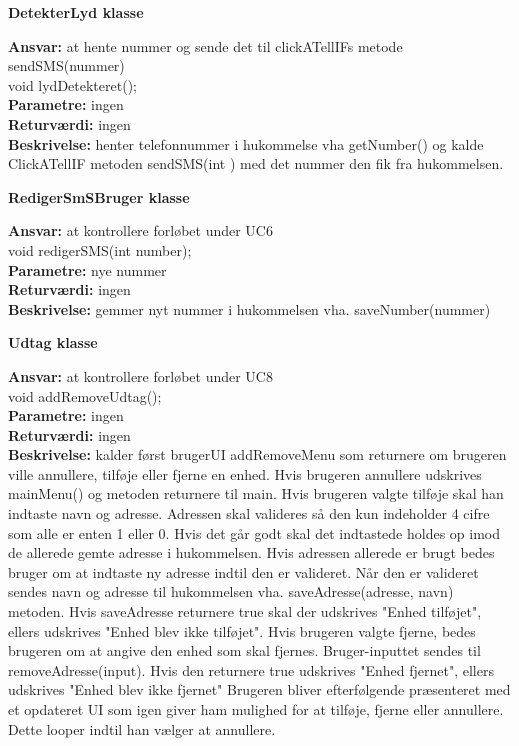 {\centering 
\textbf{DetekterLyd klasse}\par
}
\textbf{Ansvar:} at hente nummer og sende det til clickATellIFs metode sendSMS(nummer) \\

void lydDetekteret(); \\
\textbf{Parametre:} ingen \\
\textbf{Returværdi:} ingen \\
\textbf{Beskrivelse:} henter telefonnummer i hukommelse vha getNumber() og kalde ClickATellIF metoden sendSMS(int ) med det nummer den fik fra hukommelsen. \\

{\centering 
\textbf{RedigerSmSBruger klasse}\par
}
\textbf{Ansvar:} at kontrollere forløbet under UC6 \\

void redigerSMS(int number); \\
\textbf{Parametre:} nye nummer \\
\textbf{Returværdi:} ingen \\
\textbf{Beskrivelse:} gemmer nyt nummer i hukommelsen vha. saveNumber(nummer) \\

{\centering 
\textbf{Udtag klasse}\par
}
\textbf{Ansvar:} at kontrollere forløbet under UC8 \\

void addRemoveUdtag(); \\
\textbf{Parametre:} ingen \\
\textbf{Returværdi:} ingen \\
\textbf{Beskrivelse:} kalder først brugerUI addRemoveMenu som returnere om brugeren ville annullere, tilføje eller fjerne en enhed. Hvis brugeren annullere udskrives mainMenu() og metoden returnere til main. 
\newline Hvis brugeren valgte tilføje skal han indtaste navn og adresse. Adressen skal valideres så den kun indeholder 4 cifre som alle er enten 1 eller 0. Hvis det går godt skal det indtastede holdes op imod de allerede gemte adresse i hukommelsen. Hvis adressen allerede er brugt bedes bruger om at indtaste ny adresse indtil den er valideret. Når den er valideret sendes navn og adresse til hukommelsen vha. saveAdresse(adresse, navn) metoden. Hvis saveAdresse returnere true skal der udskrives "Enhed tilføjet", ellers udskrives "Enhed blev ikke tilføjet".
\newline Hvis brugeren valgte fjerne, bedes brugeren om at angive den enhed som skal fjernes. Bruger-inputtet sendes til removeAdresse(input). Hvis den returnere true udskrives "Enhed fjernet", ellers udskrives "Enhed blev ikke fjernet"
\newline Brugeren bliver efterfølgende præsenteret med et opdateret UI som igen giver ham mulighed for at tilføje, fjerne eller annullere. Dette looper indtil han vælger at annullere.\\

